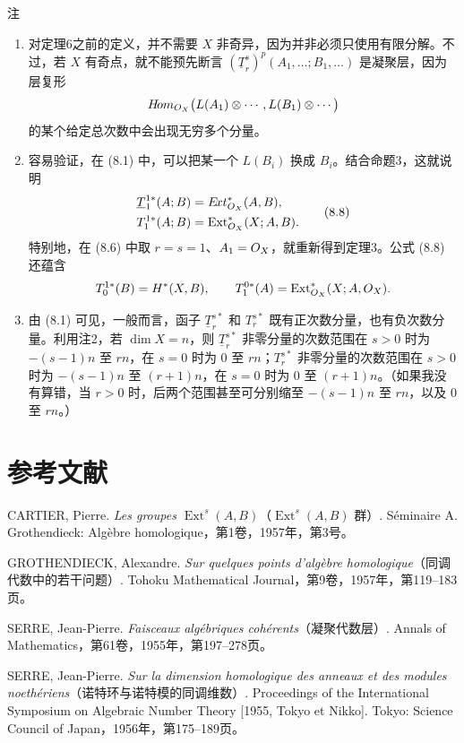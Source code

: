 \begin{statement}{注}
\begin{enumerate}[label=\arabic*°.]
\item 对定理6之前的定义，并不需要 $X$ 非奇异，因为并非必须只使用有限分解。不过，若 $X$ 有奇点，就不能预先断言 $(\underline T_r^s)^p(A_1,\ldots;B_1,\ldots)$ 是凝聚层，因为层复形
\[
H\!om_{O_X}\bigl(L(A_1)\otimes\cdots,L(B_1)\otimes\cdots\bigr)
\]
的某个给定总次数中会出现无穷多个分量。
\item 容易验证，在 (8.1) 中，可以把某一个 $L(B_i)$ 换成 $B_i$。结合命题3，这就说明
\begin{equation}
\begin{aligned}
\underline T_1^{1*}(A;B)&=E\!xt_{O_X}^{*}(A,B),\\
T_1^{1*}(A;B)&=\operatorname{Ext}_{O_X}^{*}(X;A,B).
\end{aligned}\tag{8.8}
\end{equation}
特别地，在 (8.6) 中取 $r=s=1$、$A_1=O_X$，就重新得到定理3。公式 (8.8) 还蕴含
\[
T_0^{1*}(B)=H^*(X,B),\qquad
T_1^{0*}(A)=\operatorname{Ext}_{O_X}^{*}(X;A,O_X).
\]
\item 由 (8.1) 可见，一般而言，函子 $\underline T_r^{s*}$ 和 $T_r^{s*}$ 既有正次数分量，也有负次数分量。利用注2，若 $\dim X=n$，则 $\underline T_r^{s*}$ 非零分量的次数范围在 $s>0$ 时为 $-(s-1)n$ 至 $rn$，在 $s=0$ 时为 $0$ 至 $rn$；$T_r^{s*}$ 非零分量的次数范围在 $s>0$ 时为 $-(s-1)n$ 至 $(r+1)n$，在 $s=0$ 时为 $0$ 至 $(r+1)n$。（如果我没有算错，当 $r>0$ 时，后两个范围甚至可分别缩至 $-(s-1)n$ 至 $rn$，以及 $0$ 至 $rn$。）
\end{enumerate}
\end{statement}

\section*{参考文献}
\begin{enumerate}[label={[\arabic*]}]
\item CARTIER, Pierre. \emph{Les groupes $\operatorname{Ext}^s(A,B)$}（$\operatorname{Ext}^s(A,B)$ 群）. Séminaire A. Grothendieck: Algèbre homologique，第1卷，1957年，第3号。
\item GROTHENDIECK, Alexandre. \emph{Sur quelques points d'algèbre homologique}（同调代数中的若干问题）. Tohoku Mathematical Journal，第9卷，1957年，第119--183页。
\item SERRE, Jean-Pierre. \emph{Faisceaux algébriques cohérents}（凝聚代数层）. Annals of Mathematics，第61卷，1955年，第197--278页。
\item SERRE, Jean-Pierre. \emph{Sur la dimension homologique des anneaux et des modules noethériens}（诺特环与诺特模的同调维数）. Proceedings of the International Symposium on Algebraic Number Theory [1955, Tokyo et Nikko]. Tokyo: Science Council of Japan，1956年，第175--189页。
\end{enumerate}

